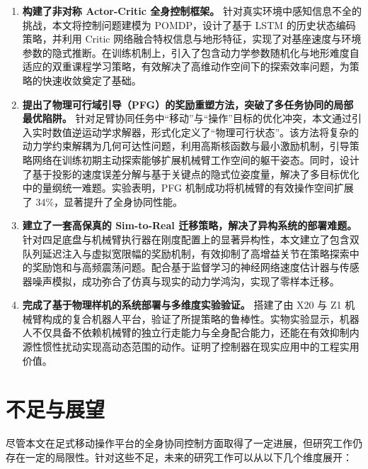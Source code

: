 \begin{enumerate}
    \item \textbf{构建了非对称 Actor-Critic 全身控制框架。}
          针对真实环境中感知信息不全的挑战，本文将控制问题建模为 POMDP，设计了基于 LSTM 的历史状态编码策略，并利用 Critic 网络融合特权信息与地形特征，实现了对基座速度与环境参数的隐式推断。在训练机制上，引入了包含动力学参数随机化与地形难度自适应的双重课程学习策略，有效解决了高维动作空间下的探索效率问题，为策略的快速收敛奠定了基础。

    \item \textbf{提出了物理可行域引导（PFG）的奖励重塑方法，突破了多任务协同的局部最优陷阱。}
          针对足臂协同任务中“移动”与“操作”目标的优化冲突，本文通过引入实时数值逆运动学求解器，形式化定义了“物理可行状态”。该方法将复杂的动力学约束解耦为几何可达性问题，利用高斯核函数与最小激励机制，引导策略网络在训练初期主动探索能够扩展机械臂工作空间的躯干姿态。同时，设计了基于投影的速度误差分解与基于关键点的隐式位姿度量，解决了多目标优化中的量纲统一难题。实验表明，PFG 机制成功将机械臂的有效操作空间扩展了 34\%，显著提升了全身协同性能。

    \item \textbf{建立了一套高保真的 Sim-to-Real 迁移策略，解决了异构系统的部署难题。}
          针对四足底盘与机械臂执行器在刚度配置上的显著异构性，本文建立了包含双队列延迟注入与虚拟宽限幅的奖励机制，有效抑制了高增益关节在策略探索中的奖励饱和与高频震荡问题。配合基于监督学习的神经网络速度估计器与传感器噪声模拟，成功弥合了仿真与现实的动力学鸿沟，实现了零样本迁移。

    \item \textbf{完成了基于物理样机的系统部署与多维度实验验证。}
          搭建了由 X20 与 Z1 机械臂构成的复合机器人平台，验证了所提策略的鲁棒性。实物实验显示，机器人不仅具备不依赖机械臂的独立行走能力与全身配合能力，还能在有效抑制内源性惯性扰动实现高动态范围的动作。证明了控制器在现实应用中的工程实用价值。
\end{enumerate}

\section{不足与展望}

尽管本文在足式移动操作平台的全身协同控制方面取得了一定进展，但研究工作仍存在一定的局限性。针对这些不足，未来的研究工作可以从以下几个维度展开：

